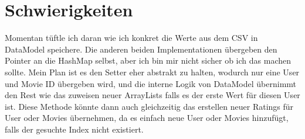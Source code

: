 \documentclass{article}
\begin{document}
	\section*{Schwierigkeiten}
		Momentan tüftle ich daran wie ich konkret die Werte aus dem CSV in DataModel speichere. Die anderen beiden Implementationen übergeben den Pointer an die HashMap selbst, aber ich bin mir nicht sicher ob ich das machen sollte. Mein Plan ist es den Setter eher abstrakt zu halten, wodurch nur eine User und Movie ID übergeben wird, und die interne Logik von DataModel übernimmt den Rest wie das zuweisen neuer ArrayLists falls es der erste Wert für diesen User ist. Diese Methode könnte dann auch gleichzeitig das erstellen neuer Ratings für User oder Movies übernehmen, da es einfach neue User oder Movies hinzufügt, falls der gesuchte Index nicht existiert.
	























  
\end{document}
